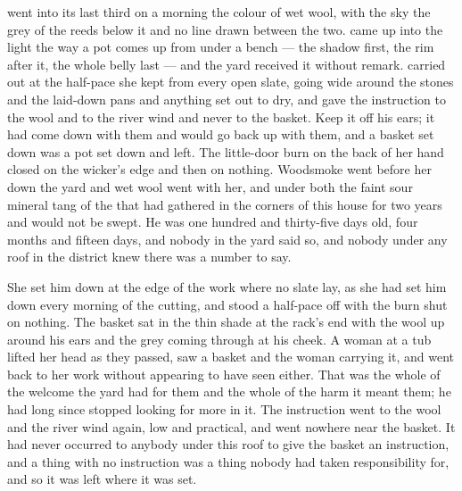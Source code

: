 
 went into its last third on a morning the colour of wet wool, with the sky the grey of the reeds below it and no line drawn between the two.  came up into the light the way a pot comes up from under a bench --- the shadow first, the rim after it, the whole belly last --- and the yard received it without remark.  carried  out at the half-pace she kept from every open slate, going wide around the stones and the laid-down pans and anything set out to dry, and gave the instruction to the wool and to the river wind and never to the basket. Keep it off his ears; it had come down with them and would go back up with them, and a basket set down was a pot set down and left. The little-door burn on the back of her hand closed on the wicker's edge and then on nothing. Woodsmoke went before her down the yard and wet wool went with her, and under both the faint sour mineral tang of the  that had gathered in the corners of this house for two years and would not be swept. He was one hundred and thirty-five days old, four months and fifteen days, and nobody in the yard said so, and nobody under any roof in the district knew there was a number to say.

She set him down at the edge of the work where no slate lay, as she had set him down every morning of the cutting, and stood a half-pace off with the burn shut on nothing. The basket sat in the thin shade at the rack's end with the wool up around his ears and the grey coming through at his cheek. A woman at a tub lifted her head as they passed, saw a basket and the woman carrying it, and went back to her work without appearing to have seen either. That was the whole of the welcome the yard had for them and the whole of the harm it meant them; he had long since stopped looking for more in it. The instruction went to the wool and the river wind again, low and practical, and went nowhere near the basket. It had never occurred to anybody under this roof to give the basket an instruction, and a thing with no instruction was a thing nobody had taken responsibility for, and so it was left where it was set.

